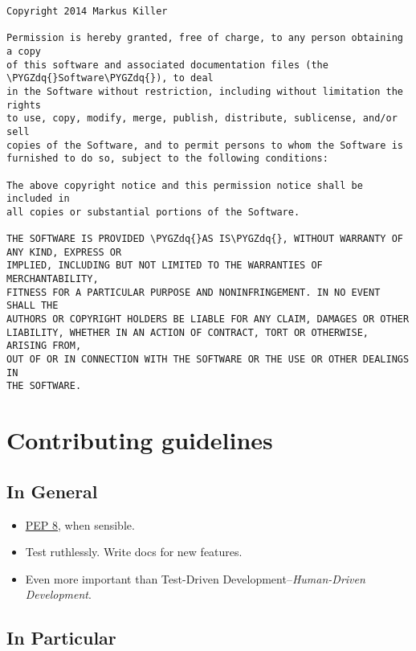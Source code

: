 \documentclass[letterpaper,10pt,english]{sphinxmanual}
\def\PYGZdq{\char`\"}
\begin{document}
\begin{Verbatim}[commandchars=\\\{\}]
Copyright 2014 Markus Killer

Permission is hereby granted, free of charge, to any person obtaining a copy
of this software and associated documentation files (the \PYGZdq{}Software\PYGZdq{}), to deal
in the Software without restriction, including without limitation the rights
to use, copy, modify, merge, publish, distribute, sublicense, and/or sell
copies of the Software, and to permit persons to whom the Software is
furnished to do so, subject to the following conditions:

The above copyright notice and this permission notice shall be included in
all copies or substantial portions of the Software.

THE SOFTWARE IS PROVIDED \PYGZdq{}AS IS\PYGZdq{}, WITHOUT WARRANTY OF ANY KIND, EXPRESS OR
IMPLIED, INCLUDING BUT NOT LIMITED TO THE WARRANTIES OF MERCHANTABILITY,
FITNESS FOR A PARTICULAR PURPOSE AND NONINFRINGEMENT. IN NO EVENT SHALL THE
AUTHORS OR COPYRIGHT HOLDERS BE LIABLE FOR ANY CLAIM, DAMAGES OR OTHER
LIABILITY, WHETHER IN AN ACTION OF CONTRACT, TORT OR OTHERWISE, ARISING FROM,
OUT OF OR IN CONNECTION WITH THE SOFTWARE OR THE USE OR OTHER DEALINGS IN
THE SOFTWARE.
\end{Verbatim}


\section{Contributing guidelines}
\label{contributing:contributing-guidelines}\label{contributing::doc}

\subsection{In General}
\label{contributing:in-general}\begin{itemize}
\item {} 
\href{http://www.python.org/dev/peps/pep-0008/}{PEP 8}, when sensible.

\item {} 
Test ruthlessly. Write docs for new features.

\item {} 
Even more important than Test-Driven Development--\emph{Human-Driven Development}.

\end{itemize}


\subsection{In Particular}
\label{contributing:in-particular}\label{contributing:pep-8}
\end{document}
